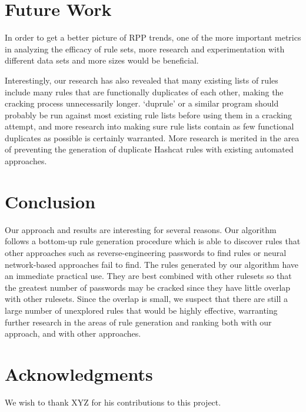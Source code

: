 \documentclass{article}
\begin{document}
\section{Future Work}
\label{sec:future-work}



In order to get a better picture of RPP trends, one of the more important
metrics
in analyzing the efficacy of rule sets, more research and experimentation with
different data sets and more sizes would be beneficial.

Interestingly, our research has also revealed that many existing lists of rules
include many rules that are functionally duplicates of each other, making the
cracking process unnecessarily longer. `duprule' or a similar program should
probably be run against most existing rule lists before using them in a cracking
attempt, and more research into making sure rule lists contain as few functional
duplicates as possible is certainly warranted. More research is merited in
the area of preventing the generation of duplicate Hashcat rules with
existing automated approaches.

\section{Conclusion}

Our approach and results are interesting for several reasons. Our algorithm follows a bottom-up rule generation procedure which is able to discover rules that other approaches such as reverse-engineering passwords to find rules or neural network-based approaches fail to find. The rules generated by our algorithm have an immediate practical use. They are best combined with other rulesets so that the greatest number of passwords may be cracked since they have little overlap with other rulesets. Since the overlap is small, we suspect that there are still
a large number of unexplored rules that would be highly effective, warranting
further research in the areas of rule generation and ranking both with our approach,
and with other approaches.

\section*{Acknowledgments}

We wish to thank XYZ for his contributions to this project.
\end{document}
